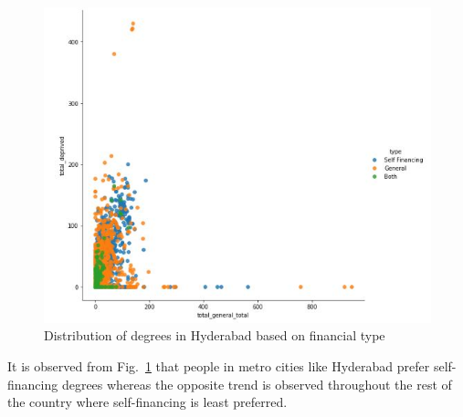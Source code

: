 \begin{figure}[h]
\centerline{\includegraphics[scale=0.6]{figures/hyd.jpg}}
\caption{Distribution of degrees in Hyderabad based on financial type}
\label{hyd}
\end{figure}

It is observed from Fig.~\ref{hyd} that people in metro cities like Hyderabad prefer self-financing degrees whereas the opposite trend is observed throughout the rest of the country where self-financing is least preferred.